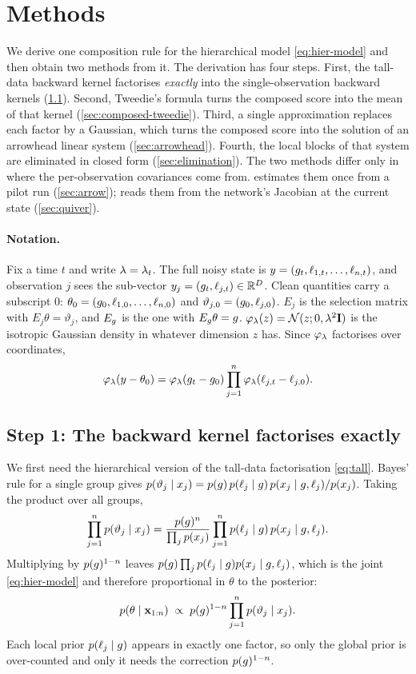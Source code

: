 \section{Methods}\label{sec:methods}

We derive one composition rule for the hierarchical model \cref{eq:hier-model} and then obtain two methods from it.
The derivation has four steps.
First, the tall-data backward kernel factorises \emph{exactly} into the single-observation backward kernels (\cref{sec:factorisation}).
Second, Tweedie's formula turns the composed score into the mean of that kernel (\cref{sec:composed-tweedie}).
Third, a single approximation replaces each factor by a Gaussian, which turns the composed score into the solution of an arrowhead linear system (\cref{sec:arrowhead}).
Fourth, the local blocks of that system are eliminated in closed form (\cref{sec:elimination}).
The two methods differ only in where the per-observation covariances come from.
\arrowm{} estimates them once from a pilot run (\cref{sec:arrow}); \quiver{} reads them from the network's Jacobian at the current state (\cref{sec:quiver}).

\paragraph{Notation.}
Fix a time $t$ and write $\lambda=\lambda_t$.
The full noisy state is $y=(g_t,\ell_{1,t},\dots,\ell_{n,t})$, and observation $j$ sees the sub-vector $y_j=(g_t,\ell_{j,t})\in\mathbb{R}^D$.
Clean quantities carry a subscript $0$: $\theta_0=(g_0,\ell_{1,0},\dots,\ell_{n,0})$ and $\vartheta_{j,0}=(g_0,\ell_{j,0})$.
$E_j$ is the selection matrix with $E_j\theta=\vartheta_j$, and $E_g$ is the one with $E_g\theta=g$.
$\varphi_\lambda(z)=\mathcal{N}(z;0,\lambda^2\mathbf{I})$ is the isotropic Gaussian density in whatever dimension $z$ has.
Since $\varphi_\lambda$ factorises over coordinates,
\begin{equation}\label{eq:forward-factorises}
  \varphi_\lambda(y-\theta_0)=\varphi_\lambda(g_t-g_0)\prod_{j=1}^{n}\varphi_\lambda(\ell_{j,t}-\ell_{j,0}).
\end{equation}

\subsection{Step 1: The backward kernel factorises exactly}\label{sec:factorisation}

We first need the hierarchical version of the tall-data factorisation \cref{eq:tall}.
Bayes' rule for a single group gives $p(\vartheta_j\mid x_j)=p(g)\,p(\ell_j\mid g)\,p(x_j\mid g,\ell_j)/p(x_j)$.
Taking the product over all groups,
\[
  \prod_{j=1}^n p(\vartheta_j\mid x_j)=\frac{p(g)^n}{\prod_j p(x_j)}\prod_{j=1}^n p(\ell_j\mid g)\,p(x_j\mid g,\ell_j).
\]
Multiplying by $p(g)^{1-n}$ leaves $p(g)\prod_j p(\ell_j\mid g)p(x_j\mid g,\ell_j)$, which is the joint \cref{eq:hier-model} and therefore proportional in $\theta$ to the posterior:
\begin{equation}\label{eq:hier-tall}
  p(\theta\mid\mathbf{x}_{1:n})\;\propto\;p(g)^{1-n}\prod_{j=1}^{n}p(\vartheta_j\mid x_j).
\end{equation}
Each local prior $p(\ell_j\mid g)$ appears in exactly one factor, so only the global prior is over-counted and only it needs the correction $p(g)^{1-n}$.

